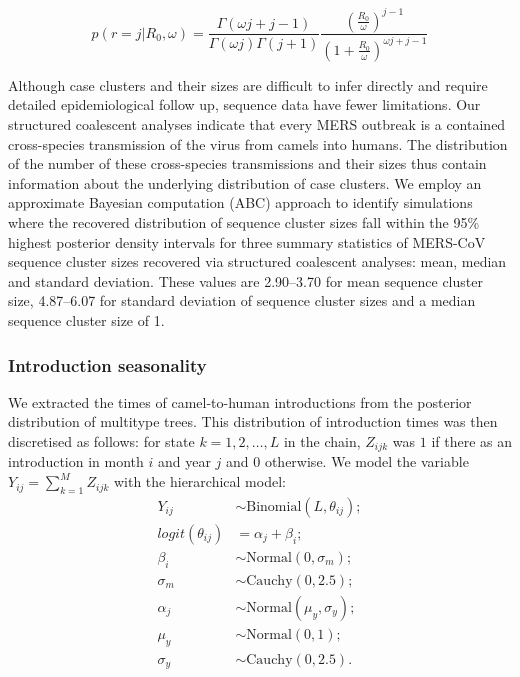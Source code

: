 \documentclass[11pt,oneside,letterpaper]{article}
\begin{document}
\begin{equation}
p(r = j | R_{0}, \omega) = \frac{\Gamma(\omega j+j-1)}{\Gamma(\omega j)\Gamma(j+1)} \frac{(\frac{R_{0}}{\omega})^{j-1}}{(1+\frac{R_{0}}{\omega})^{\omega j+j-1}}
\label{clusterLikelihood}
\end{equation}

Although case clusters and their sizes are difficult to infer directly and require detailed epidemiological follow up, sequence data have fewer limitations.
Our structured coalescent analyses indicate that every MERS outbreak is a contained cross-species transmission of the virus from camels into humans.
The distribution of the number of these cross-species transmissions and their sizes thus contain information about the underlying distribution of case clusters.
We employ an approximate Bayesian computation (ABC) approach to identify simulations where the recovered distribution of sequence cluster sizes fall within the 95\% highest posterior density intervals for three summary statistics of MERS-CoV sequence cluster sizes recovered via structured coalescent analyses: mean, median and standard deviation.
These values are 2.90--3.70 for mean sequence cluster size, 4.87--6.07 for standard deviation of sequence cluster sizes and a median sequence cluster size of 1.

\subsubsection*{Introduction seasonality}
We extracted the times of camel-to-human introductions from the posterior distribution of multitype trees.
This distribution of introduction times was then discretised as follows: for state  $k = 1, 2, \ldots, L$ in the chain,  $Z_{ijk}$ was $1$ if there as an introduction in month $i$ and year $j$ and $0$ otherwise.
We model the variable $Y_{ij} = \sum_{k = 1}^M Z_{ijk}$ with the hierarchical model:
\begin{align*}
  Y_{ij} &\sim \text{Binomial}(L, \theta_{ij}); \\
  logit(\theta_{ij}) &= \alpha_j + \beta_i; \\
  \beta_i &\sim \text{Normal}(0, \sigma_{m}); \\
  \sigma_{m} &\sim \text{Cauchy}(0, 2.5); \\
  \alpha_j &\sim \text{Normal}(\mu_{y}, \sigma_{y}); \\
  \mu_{y}  &\sim  \text{Normal}(0, 1); \\
  \sigma_{y} &\sim \text{Cauchy}(0, 2.5).
\end{align*}
\end{document}
